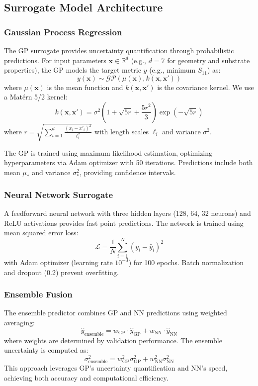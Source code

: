 \documentclass[conference]{IEEEtran}
\begin{document}
\subsection{Surrogate Model Architecture}

\subsubsection{Gaussian Process Regression}
The GP surrogate provides uncertainty quantification through probabilistic predictions. For input parameters $\mathbf{x} \in \mathbb{R}^d$ (e.g., $d=7$ for geometry and substrate properties), the GP models the target metric $y$ (e.g., minimum $S_{11}$) as:
\begin{equation}
y(\mathbf{x}) \sim \mathcal{GP}(\mu(\mathbf{x}), k(\mathbf{x}, \mathbf{x}'))
\end{equation}
where $\mu(\mathbf{x})$ is the mean function and $k(\mathbf{x}, \mathbf{x}')$ is the covariance kernel. We use a Matérn 5/2 kernel:
\begin{equation}
k(\mathbf{x}, \mathbf{x}') = \sigma^2 \left(1 + \sqrt{5r} + \frac{5r^2}{3}\right) \exp(-\sqrt{5r})
\end{equation}
where $r = \sqrt{\sum_{i=1}^d \frac{(x_i - x'_i)^2}{\ell_i^2}}$ with length scales $\ell_i$ and variance $\sigma^2$.

The GP is trained using maximum likelihood estimation, optimizing hyperparameters via Adam optimizer with 50 iterations. Predictions include both mean $\mu_*$ and variance $\sigma_*^2$, providing confidence intervals.

\subsubsection{Neural Network Surrogate}
A feedforward neural network with three hidden layers (128, 64, 32 neurons) and ReLU activations provides fast point predictions. The network is trained using mean squared error loss:
\begin{equation}
\mathcal{L} = \frac{1}{N} \sum_{i=1}^N (y_i - \hat{y}_i)^2
\end{equation}
with Adam optimizer (learning rate $10^{-3}$) for 100 epochs. Batch normalization and dropout (0.2) prevent overfitting.

\subsubsection{Ensemble Fusion}
The ensemble predictor combines GP and NN predictions using weighted averaging:
\begin{equation}
\hat{y}_{\text{ensemble}} = w_{\text{GP}} \cdot \hat{y}_{\text{GP}} + w_{\text{NN}} \cdot \hat{y}_{\text{NN}}
\end{equation}
where weights are determined by validation performance. The ensemble uncertainty is computed as:
\begin{equation}
\sigma_{\text{ensemble}}^2 = w_{\text{GP}}^2 \sigma_{\text{GP}}^2 + w_{\text{NN}}^2 \sigma_{\text{NN}}^2
\end{equation}
This approach leverages GP's uncertainty quantification and NN's speed, achieving both accuracy and computational efficiency.
\end{document}
